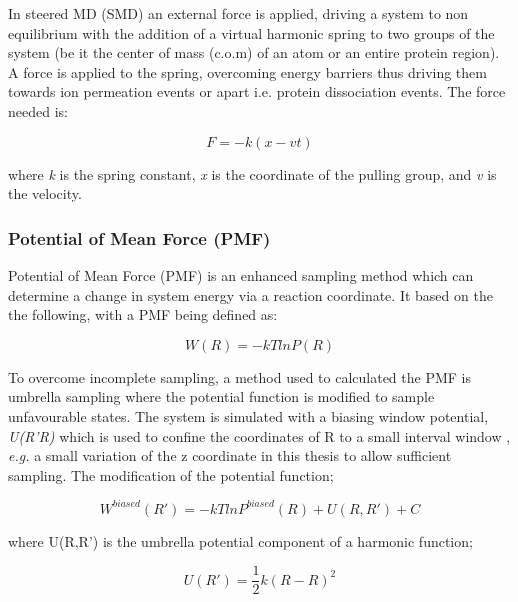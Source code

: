 In steered MD (SMD) an external force is applied, driving a system to non equilibrium \cite{Izrailev1998} with the addition of a virtual harmonic spring to two groups of the system (be it the center of mass (c.o.m) of an atom or an entire protein region). A force is applied to the spring, overcoming energy barriers thus driving them towards ion permeation events or apart i.e. protein dissociation events. The force needed is:

\begin{equation}
F= -k(x-vt)
\label{eq:smd}
\end{equation}

where \textit{k} is the spring constant, \textit{x} is the coordinate of the pulling group, and \textit{v} is the velocity. 

\subsubsection*{Potential of Mean Force (PMF)}

Potential of Mean Force (PMF) is an enhanced sampling method which can determine a change in system energy via a reaction coordinate.  It based on the the following, with a PMF being defined as:

\begin{equation}
W(R)=-kTlnP(R)
\label{eq:pmf1}
\end{equation}

To overcome incomplete sampling, a method used to calculated the PMF is umbrella sampling where the potential function is modified to sample unfavourable states. The system is simulated with a biasing window potential, \textit{U(R'R)} which is used to confine the coordinates of R to a small interval window \cite{Roux1995}, \textit{e.g.} a small variation of the z coordinate in this thesis to allow sufficient sampling. The modification of the potential function;

\begin{equation}
W^{biased}(R')=-kTlnP^{biased}(R)+U(R,R')+C
\label{eq:pmf_bias}
\end{equation} 

where U(R,R') is the umbrella potential component of a harmonic function;

\begin{equation}
U(R') = \frac{1}{2}k(R-R)^2
\label{eq:pmf_bias2}
\end{equation}

